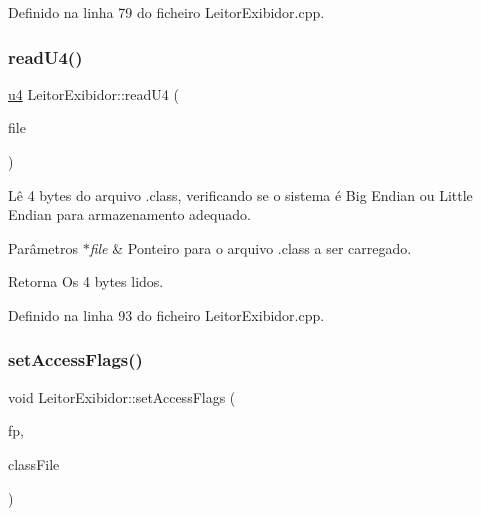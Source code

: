 Definido na linha 79 do ficheiro Leitor\+Exibidor.\+cpp.

\mbox{\label{classLeitorExibidor_a5ce4bdf25870ab04449d4ba35a961390}} 
\subsubsection{\texorpdfstring{read\+U4()}{readU4()}}
{\footnotesize\ttfamily \hyperlink{BasicTypes_8h_ae5be1f726785414dd1b77d60df074c9d}{u4} Leitor\+Exibidor\+::read\+U4 (\begin{DoxyParamCaption}\item[{F\+I\+LE $\ast$}]{file }\end{DoxyParamCaption})\hspace{0.3cm}{\ttfamily [private]}}

Lê 4 bytes do arquivo .class, verificando se o sistema é Big Endian ou Little Endian para armazenamento adequado. 
\begin{DoxyParams}{Parâmetros}
{\em $\ast$file} & Ponteiro para o arquivo .class a ser carregado. \\
\hline
\end{DoxyParams}
\begin{DoxyReturn}{Retorna}
Os 4 bytes lidos. 
\end{DoxyReturn}


Definido na linha 93 do ficheiro Leitor\+Exibidor.\+cpp.

\mbox{\label{classLeitorExibidor_a7934c3a6d4da59ecb351d32b74240c60}} 
\subsubsection{\texorpdfstring{set\+Access\+Flags()}{setAccessFlags()}}
{\footnotesize\ttfamily void Leitor\+Exibidor\+::set\+Access\+Flags (\begin{DoxyParamCaption}\item[{F\+I\+LE $\ast$}]{fp,  }\item[{\hyperlink{classClassFile}{Class\+File} $\ast$}]{class\+File }\end{DoxyParamCaption})\hspace{0.3cm}{\ttfamily [private]}}

